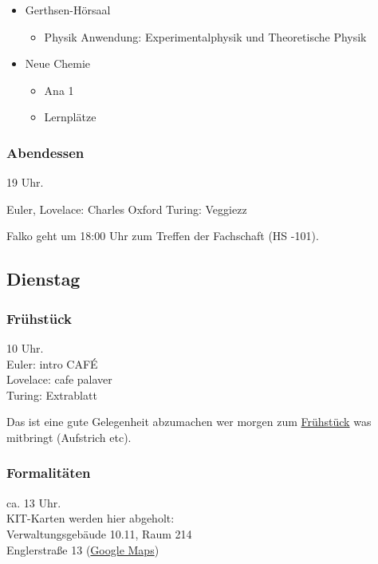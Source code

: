 \documentclass[10pt,ngerman]{scrartcl}
\begin{document}
\begin{multicols}{2}
\begin{itemize}
\begin{itemize}
        \end{itemize}
    \item Gerthsen-Hörsaal
        \begin{itemize}
            \item Physik Anwendung: Experimentalphysik und Theoretische Physik
        \end{itemize}
    \item Neue Chemie
        \begin{itemize}
            \item Ana 1
            \item Lernplätze
        \end{itemize}
\end{itemize}

\subsubsection{Abendessen}

19 Uhr.

Euler, Lovelace: Charles Oxford
Turing: Veggiezz

Falko geht um 18:00 Uhr zum Treffen der Fachschaft (HS -101).



\subsection{Dienstag}

\subsubsection{Frühstück}

10 Uhr. \\
Euler: intro CAFÉ \\
Lovelace: cafe palaver \\
Turing: Extrablatt

Das ist eine gute Gelegenheit abzumachen wer morgen zum \hyperref[mibreakfast]{Frühstück} was mitbringt (Aufstrich etc).

\subsubsection{Formalitäten}

ca. 13 Uhr. \\
KIT-Karten werden hier abgeholt: \\
Verwaltungsgebäude 10.11, Raum 214 \\
Englerstraße 13
(\href{https://goo.gl/maps/qhAjKJah3wpiFEzq5}{Google Maps})


\end{multicols}
\end{document}
